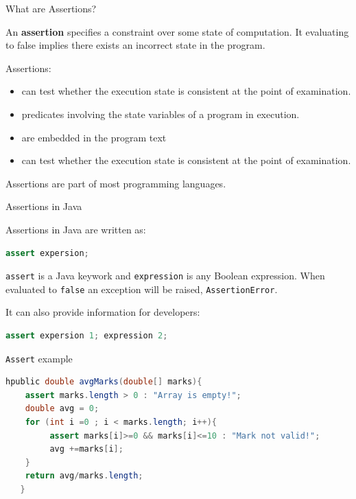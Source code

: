 \documentclass[11pt, xcolor=svgnames]{beamer}
\providecommand{\alert}[1]{\textbf{#1}}
\begin{document}

\begin{frame}{What are Assertions?}

An \alert{assertion} specifies a constraint over some state of computation. It evaluating to false implies there exists an incorrect state in the program.

Assertions: 

\begin{itemize}
  \item can test whether the execution state is consistent at the point of examination.
  \item predicates involving the state variables of a program in execution.
  \item are embedded in the program text
  \item can test whether the execution state is consistent at the point of examination.
\end{itemize}

Assertions are part of most programming languages.

\end{frame}



\begin{frame}[fragile]{Assertions in Java}

Assertions in Java are written as:

\begin{lstlisting}[language=JAVA,basicstyle=\small]
assert expersion;
\end{lstlisting}

\texttt{assert} is a Java keywork and \texttt{expression} is any Boolean expression. When evaluated to \texttt{false} an exception will be raised, \texttt{AssertionError}. 

It can also provide information for developers:

\begin{lstlisting}[language=JAVA,basicstyle=\small]
assert expersion 1; expression 2;
\end{lstlisting}

\end{frame}


\begin{frame}[fragile]{\texttt{Assert} example}

\begin{lstlisting}[language=JAVA,basicstyle=\scriptsize]
  hpublic double avgMarks(double[] marks){
 	assert marks.length > 0 : "Array is empty!";
   	double avg = 0;
   	for (int i =0 ; i < marks.length; i++){
   	     assert marks[i]>=0 && marks[i]<=10 : "Mark not valid!";
   	     avg +=marks[i];
   	}
   	return avg/marks.length;
   }
\end{lstlisting}


\end{frame}
\end{document}
